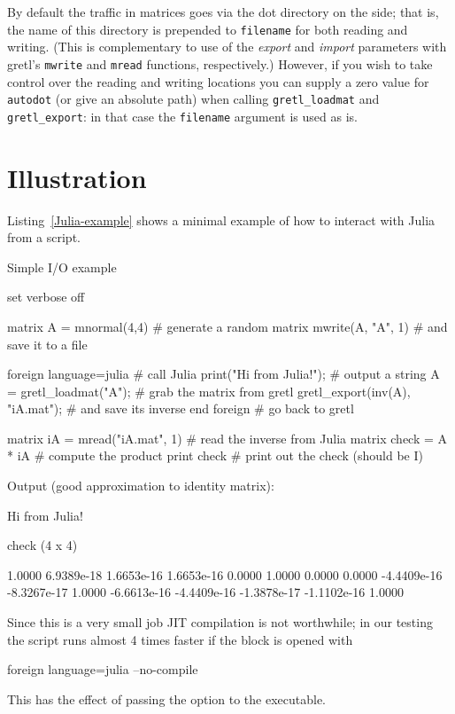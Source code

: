 By default the traffic in matrices goes via the dot directory on the
 side; that is, the name of this directory is prepended to
\texttt{filename} for both reading and writing. (This is complementary
to use of the \textsl{export} and \textsl{import} parameters with
gretl's \texttt{mwrite} and \texttt{mread} functions, respectively.)
However, if you wish to take control over the reading and writing
locations you can supply a zero value for \texttt{autodot} (or give an
absolute path) when calling \verb|gretl_loadmat| and
\verb|gretl_export|: in that case the \texttt{filename} argument is
used as is.

\section{Illustration}

Listing~\ref{Julia-example} shows a minimal example of how to interact
with Julia from a  script.

\begin{script}[htbp]
  \caption{Simple  I/O example}
\begin{scode}
set verbose off

matrix A = mnormal(4,4)                # generate a random matrix
mwrite(A, "A", 1)                      # and save it to a file

foreign language=julia                 # call Julia
    print("Hi from Julia!\n");         # output a string
    A = gretl_loadmat("A");            # grab the matrix from gretl
    gretl_export(inv(A), "iA.mat");    # and save its inverse
end foreign                            # go back to gretl

matrix iA = mread("iA.mat", 1)         # read the inverse from Julia
matrix check = A * iA                  # compute the product
print check                            # print out the check (should be I)
\end{scode}
Output (good approximation to identity matrix):
\begin{code}
Hi from Julia!

check (4 x 4)

      1.0000   6.9389e-18   1.6653e-16   1.6653e-16 
      0.0000       1.0000       0.0000       0.0000 
 -4.4409e-16  -8.3267e-17       1.0000  -6.6613e-16 
 -4.4409e-16  -1.3878e-17  -1.1102e-16       1.0000 
\end{code}
\label{Julia-example}
\end{script}

Since this is a very small job JIT compilation is not worthwhile; in
our testing the script runs almost 4 times faster if the 
block is opened with
\begin{code}
foreign language=julia --no-compile
\end{code}
This has the effect of passing the option  to the
 executable.


